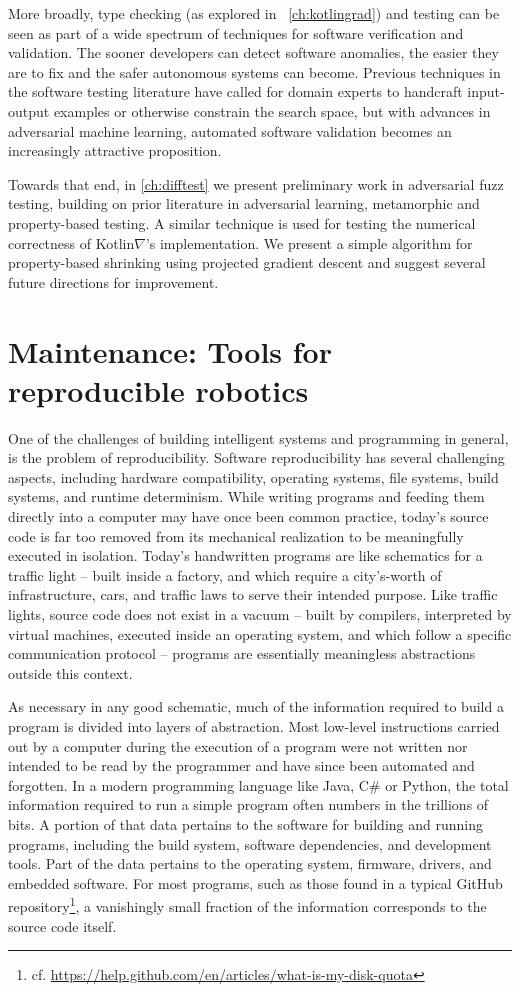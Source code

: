 \documentclass[12pt,initial,twoside,maitrise]{dms}
\numberwithin{equation}{section}
\numberwithin{table}{chapter}
\numberwithin{figure}{chapter}
\begin{document}
More broadly, type checking (as explored in ~\autoref{ch:kotlingrad}) and testing can be seen as part of a wide spectrum of techniques for software verification and validation. The sooner developers can detect software anomalies, the easier they are to fix and the safer autonomous systems can become. Previous techniques in the software testing literature have called for domain experts to handcraft input-output examples or otherwise constrain the search space, but with advances in adversarial machine learning, automated software validation becomes an increasingly attractive proposition.

Towards that end, in \autoref{ch:difftest} we present preliminary work in adversarial fuzz testing, building on prior literature in adversarial learning, metamorphic and property-based testing. A similar technique is used for testing the numerical correctness of Kotlin$\nabla$'s implementation. We present a simple algorithm for property-based shrinking using projected gradient descent and suggest several future directions for improvement.

\section{Maintenance: Tools for reproducible robotics}

One of the challenges of building intelligent systems and programming in general, is the problem of reproducibility. Software reproducibility has several challenging aspects, including hardware compatibility, operating systems, file systems, build systems, and runtime determinism. While writing programs and feeding them directly into a computer may have once been common practice, today's source code is far too removed from its mechanical realization to be meaningfully executed in isolation. Today's handwritten programs are like schematics for a traffic light -- built inside a factory, and which require a city's-worth of infrastructure, cars, and traffic laws to serve their intended purpose. Like traffic lights, source code does not exist in a vacuum -- built by compilers, interpreted by virtual machines, executed inside an operating system, and which follow a specific communication protocol -- programs are essentially meaningless abstractions outside this context.

As necessary in any good schematic, much of the information required to build a program is divided into layers of abstraction. Most low-level instructions carried out by a computer during the execution of a program were not written nor intended to be read by the programmer and have since been automated and forgotten. In a modern programming language like Java, C\# or Python, the total information required to run a simple program often numbers in the trillions of bits. A portion of that data pertains to the software for building and running programs, including the build system, software dependencies, and development tools. Part of the data pertains to the operating system, firmware, drivers, and embedded software. For most programs, such as those found in a typical GitHub repository\footnote{cf. \url{https://help.github.com/en/articles/what-is-my-disk-quota}}, a vanishingly small fraction of the information corresponds to the source code itself.
\end{document}
